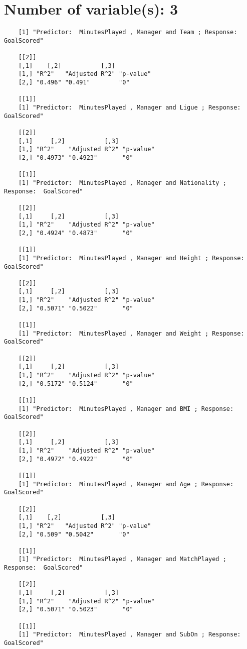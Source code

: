 \documentclass[12pt]{article}
\begin{document}
	\section{Number of variable(s): 3}
	\begin{verbatim}
	[1] "Predictor:  MinutesPlayed , Manager and Team ; Response:  GoalScored"
	
	[[2]]
	[,1]    [,2]           [,3]     
	[1,] "R^2"   "Adjusted R^2" "p-value"
	[2,] "0.496" "0.491"        "0"      
	
	[[1]]
	[1] "Predictor:  MinutesPlayed , Manager and Ligue ; Response:  GoalScored"
	
	[[2]]
	[,1]     [,2]           [,3]     
	[1,] "R^2"    "Adjusted R^2" "p-value"
	[2,] "0.4973" "0.4923"       "0"      
	
	[[1]]
	[1] "Predictor:  MinutesPlayed , Manager and Nationality ; Response:  GoalScored"
	
	[[2]]
	[,1]     [,2]           [,3]     
	[1,] "R^2"    "Adjusted R^2" "p-value"
	[2,] "0.4924" "0.4873"       "0"      
	
	[[1]]
	[1] "Predictor:  MinutesPlayed , Manager and Height ; Response:  GoalScored"
	
	[[2]]
	[,1]     [,2]           [,3]     
	[1,] "R^2"    "Adjusted R^2" "p-value"
	[2,] "0.5071" "0.5022"       "0"      
	
	[[1]]
	[1] "Predictor:  MinutesPlayed , Manager and Weight ; Response:  GoalScored"
	
	[[2]]
	[,1]     [,2]           [,3]     
	[1,] "R^2"    "Adjusted R^2" "p-value"
	[2,] "0.5172" "0.5124"       "0"      
	
	[[1]]
	[1] "Predictor:  MinutesPlayed , Manager and BMI ; Response:  GoalScored"
	
	[[2]]
	[,1]     [,2]           [,3]     
	[1,] "R^2"    "Adjusted R^2" "p-value"
	[2,] "0.4972" "0.4922"       "0"      
	
	[[1]]
	[1] "Predictor:  MinutesPlayed , Manager and Age ; Response:  GoalScored"
	
	[[2]]
	[,1]    [,2]           [,3]     
	[1,] "R^2"   "Adjusted R^2" "p-value"
	[2,] "0.509" "0.5042"       "0"      
	
	[[1]]
	[1] "Predictor:  MinutesPlayed , Manager and MatchPlayed ; Response:  GoalScored"
	
	[[2]]
	[,1]     [,2]           [,3]     
	[1,] "R^2"    "Adjusted R^2" "p-value"
	[2,] "0.5071" "0.5023"       "0"      
	
	[[1]]
	[1] "Predictor:  MinutesPlayed , Manager and SubOn ; Response:  GoalScored"
	

\end{verbatim}
\end{document}
